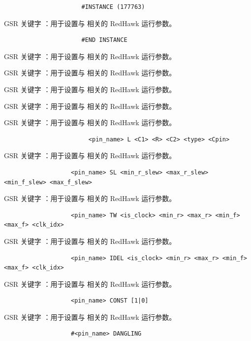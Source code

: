 \begin{lstlisting}
                      #INSTANCE (177763)
\end{lstlisting}

GSR 关键字 ：用于设置与  相关的 RedHawk 运行参数。

\begin{lstlisting}
                      #END INSTANCE
\end{lstlisting}

GSR 关键字 ：用于设置与  相关的 RedHawk 运行参数。

GSR 关键字 ：用于设置与  相关的 RedHawk 运行参数。

GSR 关键字 ：用于设置与  相关的 RedHawk 运行参数。

GSR 关键字 ：用于设置与  相关的 RedHawk 运行参数。

GSR 关键字 ：用于设置与  相关的 RedHawk 运行参数。

\begin{lstlisting}
                        <pin_name> L <C1> <R> <C2> <type> <Cpin>
\end{lstlisting}

GSR 关键字 ：用于设置与  相关的 RedHawk 运行参数。

\begin{lstlisting}
                   <pin_name> SL <min_r_slew> <max_r_slew> <min_f_slew> <max_f_slew>
\end{lstlisting}

GSR 关键字 ：用于设置与  相关的 RedHawk 运行参数。

\begin{lstlisting}
                   <pin_name> TW <is_clock> <min_r> <max_r> <min_f> <max_f> <clk_idx>
\end{lstlisting}

GSR 关键字 ：用于设置与  相关的 RedHawk 运行参数。

\begin{lstlisting}
                   <pin_name> IDEL <is_clock> <min_r> <max_r> <min_f> <max_f> <clk_idx>
\end{lstlisting}

GSR 关键字 ：用于设置与  相关的 RedHawk 运行参数。

\begin{lstlisting}
                   <pin_name> CONST [1|0]
\end{lstlisting}

GSR 关键字 ：用于设置与  相关的 RedHawk 运行参数。

\begin{lstlisting}
                   #<pin_name> DANGLING
\end{lstlisting}


